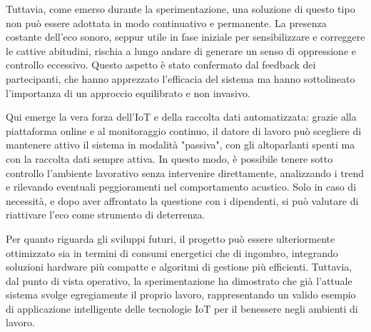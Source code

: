 \documentclass[fleqn,10pt]{SelfArx} %
\begin{document}
Tuttavia, come emerso durante la sperimentazione, una soluzione di questo tipo non può essere adottata in modo continuativo e permanente. La presenza costante dell'eco sonoro, seppur utile in fase iniziale per sensibilizzare e correggere le cattive abitudini, rischia a lungo andare di generare un senso di oppressione e controllo eccessivo. Questo aspetto è stato confermato dal feedback dei partecipanti, che hanno apprezzato l'efficacia del sistema ma hanno sottolineato l'importanza di un approccio equilibrato e non invasivo. \newline

Qui emerge la vera forza dell'IoT e della raccolta dati automatizzata: grazie alla piattaforma online e al monitoraggio continuo, il datore di lavoro può scegliere di mantenere attivo il sistema in modalità "passiva", con gli altoparlanti spenti ma con la raccolta dati sempre attiva. In questo modo, è possibile tenere sotto controllo l'ambiente lavorativo senza intervenire direttamente, analizzando i trend e rilevando eventuali peggioramenti nel comportamento acustico. Solo in caso di necessità, e dopo aver affrontato la questione con i dipendenti, si può valutare di riattivare l'eco come strumento di deterrenza. \newline

Per quanto riguarda gli sviluppi futuri, il progetto può essere ulteriormente ottimizzato sia in termini di consumi energetici che di ingombro, integrando soluzioni hardware più compatte e algoritmi di gestione più efficienti. Tuttavia, dal punto di vista operativo, la sperimentazione ha dimostrato che già l'attuale sistema svolge egregiamente il proprio lavoro, rappresentando un valido esempio di applicazione intelligente delle tecnologie IoT per il benessere negli ambienti di lavoro. \newline





\end{document}

